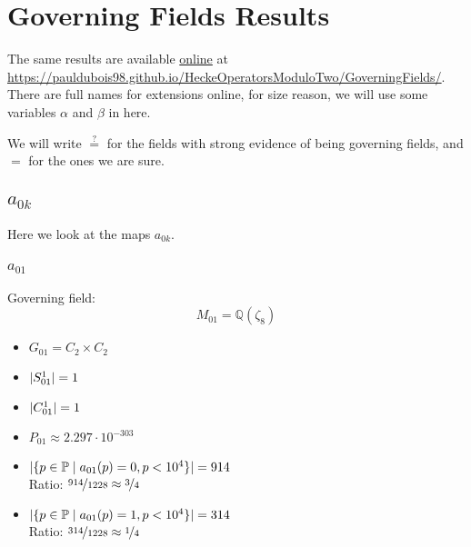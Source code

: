 
\section{Governing Fields Results}
\label{governingFieldsResults}
The same results are available \href{https://pauldubois98.github.io/HeckeOperatorsModuloTwo/GoverningFields/}{online} at \url{https://pauldubois98.github.io/HeckeOperatorsModuloTwo/GoverningFields/}.
There are full names for extensions online, for size reason, we will use some variables $\alpha$ and $\beta$ in here.

We will write $\stackrel{?}{=}$ for the fields with strong evidence of being governing fields, and $=$ for the ones we are sure.



\subsection{$a_{0k}$}
Here we look at the maps $a_{0k}$.

\subsubsection{$a_{01}$}
Governing field:
$$M_{01} = \mathbb{Q}\left(\zeta_8\right)$$
\begin{multicols}{2}
	\begin{itemize}
		\item $G_{01} = C_2 \times C_2$
		\item $| S_{01}^1 | = 1$
		\item $| C_{01}^1 | = 1$
		\item $P_{01} \approx 2.297 \cdot 10^{-303}$
	\end{itemize}
	\begin{itemize}
		\item $| \{ p \in \mathbb{P} \mid a_{01}(p)=0, p<10^4 \} | = 914$\\
		Ratio: $\nicefrac{ 914 }{ 1228 } \approx \nicefrac{ 3 }{ 4 }$
		\item $| \{ p \in \mathbb{P} \mid a_{01}(p)=1, p<10^4 \} | = 314$\\
		Ratio: $\nicefrac{ 314 }{ 1228 } \approx \nicefrac{ 1 }{ 4 }$
	\end{itemize}
\end{multicols}

